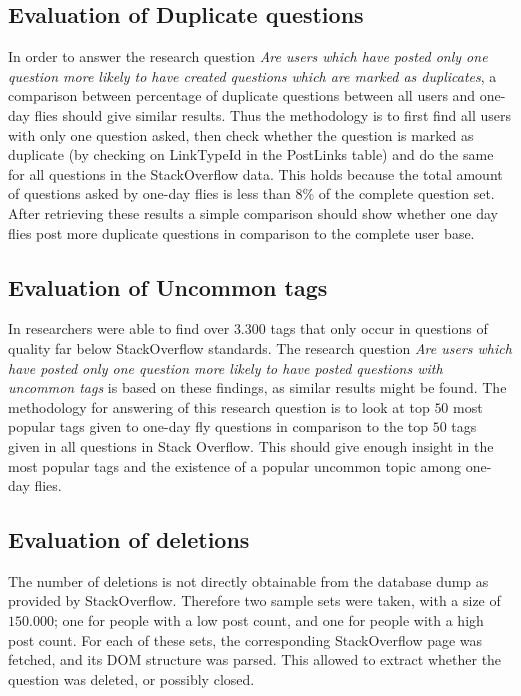 \documentclass[conference]{IEEEtran}
\begin{document}
\subsection{Evaluation of Duplicate questions}
In order to answer the research question \textit{Are users which have posted
only one question more likely to have created questions which are marked as
duplicates}, a comparison between percentage of duplicate questions  between
all users and one-day flies should give similar results. Thus the methodology
is to first find all users with only one question asked, then check whether the
question is marked as duplicate (by checking on  LinkTypeId in the PostLinks
table) and do the same for all questions in the StackOverflow data. This holds
because the total amount of questions asked by one-day flies is less than $8\%$
of the complete question set. After retrieving these results a simple
comparison should show whether one day flies post more duplicate questions in
comparison to the complete user base.

\subsection{Evaluation of Uncommon tags}
In \cite{correa2014chaff} researchers were able to find over $3.300$ tags that
only occur in questions of quality far below StackOverflow standards. The
research question \textit{Are users which have posted only one question more
likely to have posted questions with uncommon tags} is based on these findings,
as similar results might be found. The methodology for answering of this
research question is to look at top $50$ most popular tags given to one-day fly
questions in comparison to the top $50$ tags given in all questions in Stack
Overflow. This should give enough insight in the most popular tags and the
existence of a popular uncommon topic among one-day flies.

\subsection{Evaluation of deletions}

The number of deletions is not directly obtainable from the database dump as
provided by StackOverflow. Therefore two sample sets were taken, with a size of
$150.000$; one for people with a low post count, and one for people with a high
post count. For each of these sets, the corresponding StackOverflow page was
fetched, and its DOM structure was parsed. This allowed to extract whether the
question was deleted, or possibly closed.
\end{document}
